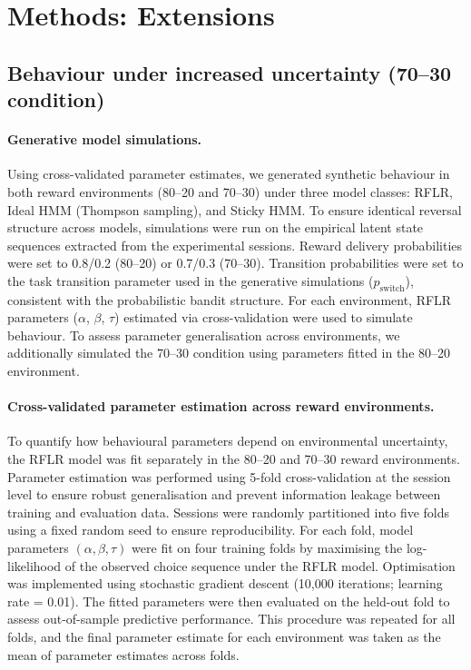\documentclass[11pt, reprint, aps, prl]{revtex4-2}
\begin{document}
\section{Methods: Extensions}
\subsection{Behaviour under increased uncertainty (70--30 condition)}
\paragraph{\textbf{Generative model simulations.}}
Using cross-validated parameter estimates, we generated synthetic behaviour in both reward environments (80--20 and 70--30) under three model classes: RFLR, Ideal HMM (Thompson sampling), and Sticky HMM. To ensure identical reversal structure across models, simulations were run on the empirical latent state sequences extracted from the experimental sessions. Reward delivery probabilities were set to 0.8/0.2 (80--20) or 0.7/0.3 (70--30). Transition probabilities were set to the task transition parameter used in the generative simulations ($p_{\mathrm{switch}}$), consistent with the probabilistic bandit structure. For each environment, RFLR parameters (\(\alpha\), \(\beta\), \(\tau\)) estimated via cross-validation were used to simulate behaviour. To assess parameter generalisation across environments, we additionally simulated the 70--30 condition using parameters fitted in the 80--20 environment. 
\paragraph{\textbf{Cross-validated parameter estimation across reward environments.}}
To quantify how behavioural parameters depend on environmental uncertainty, the RFLR model was fit separately in the 80--20 and 70--30 reward environments. Parameter estimation was performed using 5-fold cross-validation at the session level to ensure robust generalisation and prevent information leakage between training and evaluation data. Sessions were randomly partitioned into five folds using a fixed random seed to ensure reproducibility. For each fold, model parameters $(\alpha, \beta, \tau)$ were fit on four training folds by maximising the log-likelihood of the observed choice sequence under the RFLR model. Optimisation was implemented using stochastic gradient descent (10{,}000 iterations; learning rate = 0.01). The fitted parameters were then evaluated on the held-out fold to assess out-of-sample predictive performance. This procedure was repeated for all folds, and the final parameter estimate for each environment was taken as the mean of parameter estimates across folds.
\end{document}
